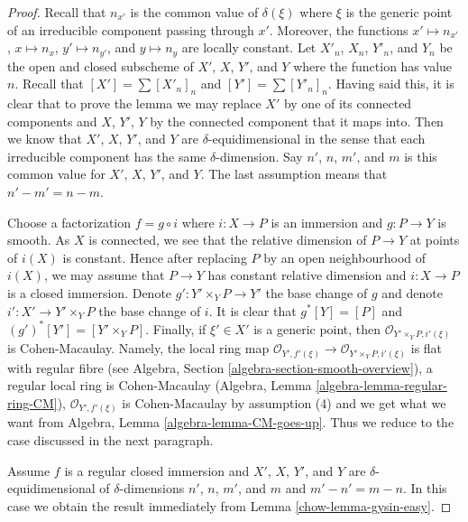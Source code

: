 \begin{proof}

Recall that $n_{x'}$ is the common value of $\delta(\xi)$
where $\xi$ is the generic point of an irreducible component
passing through $x'$. Moreover, the functions
$x' \mapsto n_{x'}$, $x \mapsto n_x$, $y' \mapsto n_{y'}$, and
$y \mapsto n_y$ are locally constant. Let $X'_n$, $X_n$, $Y'_n$,
and $Y_n$ be the open and closed subscheme of $X'$, $X$, $Y'$, and
$Y$ where the function has value $n$. Recall that
$[X'] = \sum [X'_n]_n$ and $[Y'] = \sum [Y'_n]_n$.
Having said this, it is clear that to prove the lemma we
may replace $X'$ by one of its connected components
and $X$, $Y'$, $Y$ by the connected component that
it maps into. Then we know that $X'$, $X$, $Y'$, and
$Y$ are $\delta$-equidimensional in the sense that
each irreducible component has the same $\delta$-dimension.
Say $n'$, $n$, $m'$, and $m$ is this common value
for $X'$, $X$, $Y'$, and $Y$. The last assumption
means that $n' - m' = n - m$.

\medskip\noindent
Choose a factorization $f = g \circ i$ where $i : X \to P$
is an immersion and $g : P \to Y$ is smooth. As $X$ is connected,
we see that the relative dimension of $P \to Y$ at points of $i(X)$
is constant. Hence after replacing $P$ by an open neighbourhood
of $i(X)$, we may assume that $P \to Y$ has constant relative dimension
and $i : X \to P$ is a closed immersion.
Denote $g' : Y' \times_Y P \to Y'$ the base change of $g$ and denote
$i' : X' \to Y' \times_Y P$ the base change of $i$.
It is clear that $g^*[Y] = [P]$ and $(g')^*[Y'] = [Y' \times_Y P]$.
Finally, if $\xi' \in X'$ is a generic point, then
$\mathcal{O}_{Y' \times_Y P, i'(\xi)}$ is Cohen-Macaulay.
Namely, the local ring map
$\mathcal{O}_{Y', f'(\xi)} \to \mathcal{O}_{Y' \times_Y P, i'(\xi)}$
is flat with regular fibre
(see Algebra, Section \ref{algebra-section-smooth-overview}),
a regular local ring is Cohen-Macaulay
(Algebra, Lemma \ref{algebra-lemma-regular-ring-CM}),
$\mathcal{O}_{Y', f'(\xi)}$ is Cohen-Macaulay by assumption
(4) and we get what we want from
Algebra, Lemma \ref{algebra-lemma-CM-goes-up}.
Thus we reduce to the case discussed in the next paragraph.

\medskip\noindent
Assume $f$ is a regular closed immersion and $X'$, $X$, $Y'$, and
$Y$ are $\delta$-equidimensional of $\delta$-dimensions
$n'$, $n$, $m'$, and $m$ and $m' - n' = m - n$.
In this case we obtain the result immediately from
Lemma \ref{chow-lemma-gysin-easy}.
\end{proof}

